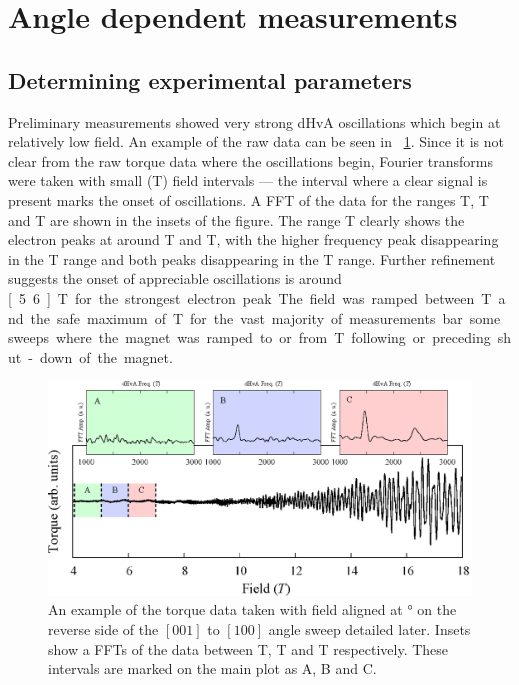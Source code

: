 
\section{Angle dependent measurements}
    \label{Sec:ResD:AngleDependentMeasurements}

\subsection{Determining experimental parameters}

Preliminary measurements showed very strong dHvA oscillations which begin at relatively low field.  An example of the raw data can be seen in \fig~\ref{Fig:ResD:RawOscillations}. Since it is not clear from the raw torque data where the oscillations begin, Fourier transforms were taken with small (\unit[1]{T}) field intervals --- the interval where a clear signal is present marks the onset of oscillations. A FFT of the data for the ranges \unit[4-5]{T}, \unit[5-6]{T} and \unit[6-7]{T} are shown in the insets of the figure. The range \unit[6-7]{T} clearly shows the electron peaks at around \unit[1500]{T} and \unit[2450]{T}, with the higher frequency peak disappearing in the \unit[5-6]{T} range and both peaks disappearing in the \unit[4-5]{T} range. Further refinement suggests the onset of appreciable oscillations is around \unit[5.6]{T} for the strongest electron peak. The field was ramped between \unit[6]{T} and the safe maximum of \unit[18]{T} for the vast majority of measurements bar some sweeps where the magnet was ramped to or from \unit[0]{T} following or preceding shut-down of the magnet.
\begin{figure}[htbp]
    \begin{center}
        \includegraphics[scale=0.7]{Chapter-dHvABaFe2P2/Figures/AngleDepMeasurements/RawOscillations/RawOscillations}
        \caption{An example of the torque data taken with field aligned at \unit[26]{\degree} on the reverse side of the $[001]$ to $[100]$ angle sweep detailed later. Insets show a FFTs of the data between \unit[4-5]{T}, \unit[5-6]{T} and \unit[6-7]{T} respectively. These intervals are marked on the main plot as A, B and C.}
        \label{Fig:ResD:RawOscillations}
    \end{center}
\end{figure}

